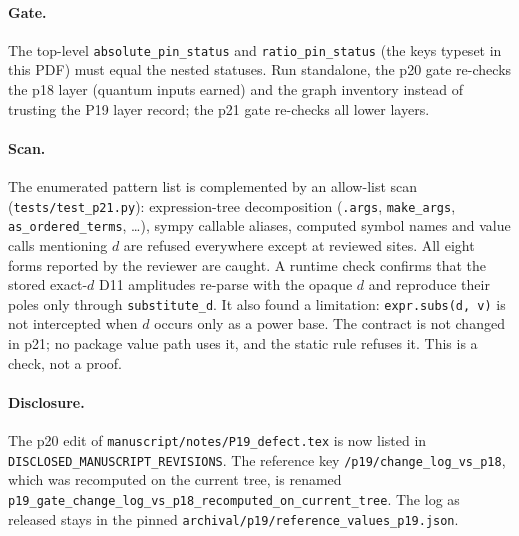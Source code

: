 \paragraph{Gate.} The top-level \texttt{absolute\_pin\_status} and \texttt{ratio\_pin\_status} (the keys typeset in
this PDF) must equal the nested statuses. Run standalone, the p20 gate re-checks the p18 layer (quantum inputs
earned) and the graph inventory instead of trusting the P19 layer record; the p21 gate re-checks all lower layers.

\paragraph{Scan.} The enumerated pattern list is complemented by an allow-list scan (\texttt{tests/test\_p21.py}):
expression-tree decomposition (\texttt{.args}, \texttt{make\_args}, \texttt{as\_ordered\_terms}, \ldots), sympy
callable aliases, computed symbol names and value calls mentioning $d$ are refused everywhere except at reviewed
sites. All eight forms reported by the reviewer are caught. A runtime check confirms that the stored exact-$d$ D11
amplitudes re-parse with the opaque $d$ and reproduce their poles only through \texttt{substitute\_d}. It also found
a limitation: \texttt{expr.subs(d, v)} is not intercepted when $d$ occurs only as a power base. The contract is not
changed in p21; no package value path uses it, and the static rule refuses it. This is a check, not a proof.

\paragraph{Disclosure.} The p20 edit of \texttt{manuscript/notes/P19\_defect.tex} is now listed in
\texttt{DISCLOSED\_MANUSCRIPT\_REVISIONS}. The reference key \texttt{/p19/change\_log\_vs\_p18}, which was recomputed
on the current tree, is renamed \texttt{p19\_gate\_change\_log\_vs\_p18\_recomputed\_on\_current\_tree}. The log as
released stays in the pinned \texttt{archival/p19/reference\_values\_p19.json}.
